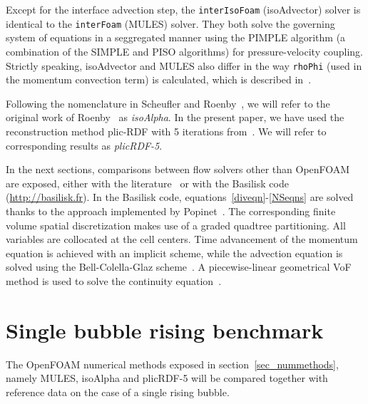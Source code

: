 \documentclass[review]{elsarticle}
\begin{document}
Except for the interface advection step, the \verb+interIsoFoam+ (isoAdvector) solver is identical to the \verb+interFoam+ (MULES) solver. They both solve the governing system of equations in a seggregated manner using the PIMPLE algorithm (a combination of the SIMPLE and PISO algorithms) for pressure-velocity coupling. Strictly speaking, isoAdvector and MULES also differ in the way \verb+rhoPhi+ (used in the momentum convection term) is calculated, which is described in~\cite{roenby_isoadvector:_2018}.

Following the nomenclature in Scheufler and Roenby~\cite{Scheufler2018}, we will refer to the original work of Roenby~\cite{Roenby160405} as {\em{isoAlpha}}. In the present paper, we have used the reconstruction method plic-RDF with 5 iterations from~\cite{Scheufler2018}. We will refer to corresponding results as {\em{plicRDF-5}}. 

In the next sections, comparisons between flow solvers other than OpenFOAM are exposed, either with the literature~\cite{Hysing2009} or with the Basilisk code (\url{http://basilisk.fr}). In the Basilisk code, equations~\ref{diveqn}-\ref{NSeqns} are solved thanks to the approach implemented by Popinet~\citep{popinet2015}. The corresponding finite volume spatial discretization makes use of a graded quadtree partitioning. All variables are collocated at the cell centers. Time advancement of the momentum equation is achieved with an implicit scheme, while the advection equation is solved using the Bell-Colella-Glaz scheme~\cite{bell1989}. A piecewise-linear geometrical VoF method is used to solve the continuity equation~\cite{popinet2009}.

\section{Single bubble rising benchmark}\label{sec_hysingcase}

The OpenFOAM numerical methods exposed in section~\ref{sec_nummethods}, namely MULES, isoAlpha and plicRDF-5 will be compared together with reference data on the case of a single rising bubble. 
\end{document}
